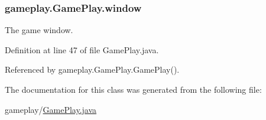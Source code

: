 \hypertarget{classgameplay_1_1_game_play_aed3cc7a8f5e4838bb0b37d4014c6133e}{
\subsubsection[{window}]{ gameplay.\-Game\-Play.\-window\hspace{0.3cm}{\ttfamily [protected]}}}\label{classgameplay_1_1_game_play_aed3cc7a8f5e4838bb0b37d4014c6133e}


The game window. 



Definition at line 47 of file Game\-Play.\-java.



Referenced by gameplay.\-Game\-Play.\-Game\-Play().



The documentation for this class was generated from the following file\-:\begin{DoxyCompactItemize}
\item 
gameplay/\hyperlink{_game_play_8java}{Game\-Play.\-java}\end{DoxyCompactItemize}
